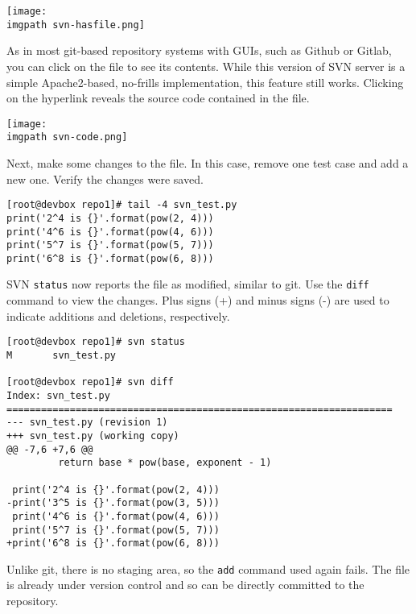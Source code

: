     \begin{minipage}[t]{\linewidth}
	  \centering
      \texttt{[image: \\imgpath svn-hasfile.png]}
    \end{minipage}

As in most git-based repository systems with GUIs, such as Github or Gitlab,
you can click on the file to see its contents. While this version of SVN
server is a simple Apache2-based, no-frills implementation, this feature still
works. Clicking on the hyperlink reveals the source code contained in the file.

    \begin{minipage}[t]{\linewidth}
	  \centering
      \texttt{[image: \\imgpath svn-code.png]}
    \end{minipage}

Next, make some changes to the file. In this case, remove one test case and
add a new one. Verify the changes were saved.

\begin{verbatim}
[root@devbox repo1]# tail -4 svn_test.py
print('2^4 is {}'.format(pow(2, 4)))
print('4^6 is {}'.format(pow(4, 6)))
print('5^7 is {}'.format(pow(5, 7)))
print('6^8 is {}'.format(pow(6, 8)))
\end{verbatim}

SVN \verb|status| now reports the file as modified, similar to git. Use the
\verb|diff| command to view the changes. Plus signs (+) and minus signs (-)
are used to indicate additions and deletions, respectively.

\begin{verbatim}
[root@devbox repo1]# svn status
M       svn_test.py

[root@devbox repo1]# svn diff
Index: svn_test.py
===================================================================
--- svn_test.py	(revision 1)
+++ svn_test.py	(working copy)
@@ -7,6 +7,6 @@
         return base * pow(base, exponent - 1)

 print('2^4 is {}'.format(pow(2, 4)))
-print('3^5 is {}'.format(pow(3, 5)))
 print('4^6 is {}'.format(pow(4, 6)))
 print('5^7 is {}'.format(pow(5, 7)))
+print('6^8 is {}'.format(pow(6, 8)))
\end{verbatim}

Unlike git, there is no staging area, so the \verb|add| command used again
fails. The file is already under version control and so can be directly
committed to the repository.

